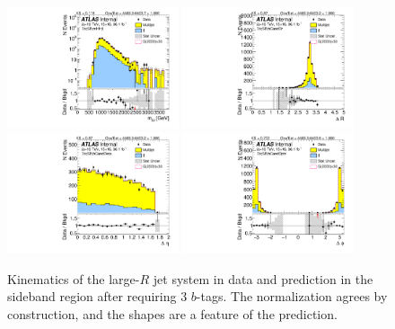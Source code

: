 \begin{figure}[htbp!]
\begin{center}
\includegraphics[width=0.45\textwidth,angle=-90]{figures/boosted/Sideband/b77_ThreeTag_Sideband_mHH_l_1.pdf}
\includegraphics[width=0.45\textwidth,angle=-90]{figures/boosted/Sideband/b77_ThreeTag_Sideband_hCandDr.pdf}\\
\includegraphics[width=0.45\textwidth,angle=-90]{figures/boosted/Sideband/b77_ThreeTag_Sideband_hCandDeta.pdf}
\includegraphics[width=0.45\textwidth,angle=-90]{figures/boosted/Sideband/b77_ThreeTag_Sideband_hCandDphi.pdf}
  \caption{Kinematics of the large-$R$ jet system in data and prediction in the sideband region after requiring 3 $b$-tags. The normalization agrees by construction, and the shapes are a feature of the prediction. }
  \label{fig:boosted-3b-sideband-ak10-system}
\end{center}
\end{figure}

